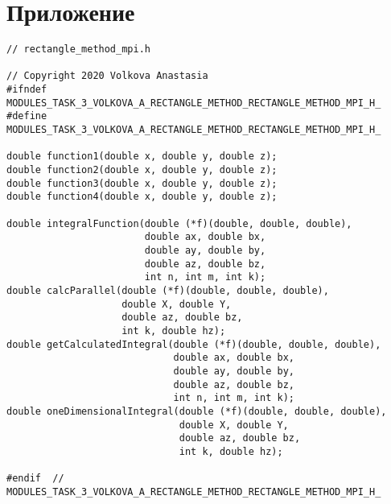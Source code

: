 \documentclass{report}
\begin{document}
\section*{Приложение}
\begin{lstlisting}
// rectangle_method_mpi.h

// Copyright 2020 Volkova Anastasia
#ifndef MODULES_TASK_3_VOLKOVA_A_RECTANGLE_METHOD_RECTANGLE_METHOD_MPI_H_
#define MODULES_TASK_3_VOLKOVA_A_RECTANGLE_METHOD_RECTANGLE_METHOD_MPI_H_

double function1(double x, double y, double z);
double function2(double x, double y, double z);
double function3(double x, double y, double z);
double function4(double x, double y, double z);

double integralFunction(double (*f)(double, double, double),
                        double ax, double bx,
                        double ay, double by,
                        double az, double bz,
                        int n, int m, int k);
double calcParallel(double (*f)(double, double, double),
                    double X, double Y,
                    double az, double bz,
                    int k, double hz);
double getCalculatedIntegral(double (*f)(double, double, double),
                             double ax, double bx,
                             double ay, double by,
                             double az, double bz,
                             int n, int m, int k);
double oneDimensionalIntegral(double (*f)(double, double, double),
                              double X, double Y,
                              double az, double bz,
                              int k, double hz);

#endif  // MODULES_TASK_3_VOLKOVA_A_RECTANGLE_METHOD_RECTANGLE_METHOD_MPI_H_
\end{lstlisting}
\end{document}
